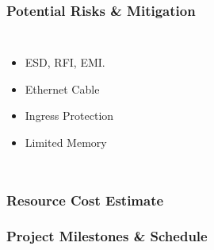\begin{frame}
\frametitle{Potential Risks \& Mitigation}

\begin{columns}[c] %

\begin{itemize}
\item ESD, RFI, EMI.
\item Ethernet Cable
\item Ingress Protection
\item Limited Memory
\end{itemize}

\end{columns}
\end{frame}

\begin{frame}
\frametitle{Resource Cost Estimate}


\end{frame}

\begin{frame}
\frametitle{Project Milestones \& Schedule}


\end{frame}
